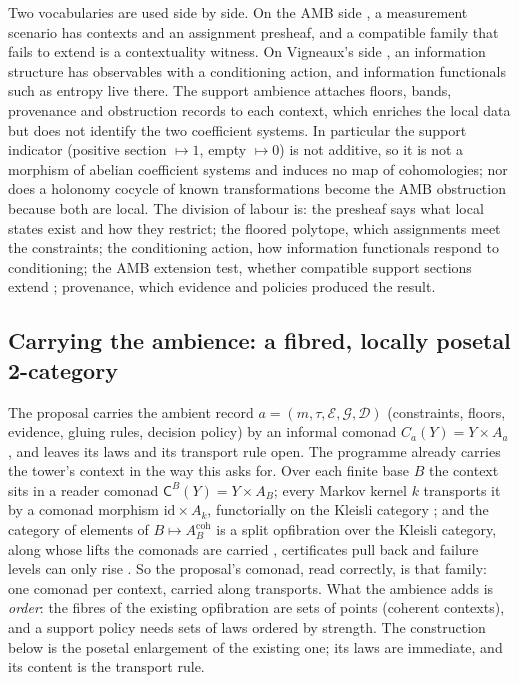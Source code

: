 \documentclass[11pt]{article}
\theoremstyle{definition}
\theoremstyle{remark}
\begin{document}
Two vocabularies are used side by side. On the AMB side \cite{AbramskyMansfieldBarbosa2012}, a measurement scenario has contexts and
an assignment presheaf, and a compatible family that fails to extend is a contextuality witness. On Vigneaux's side
\cite{Vigneaux2019,BaudotBennequin2015}, an information structure has observables with a conditioning action, and information
functionals such as entropy live there. The support ambience attaches floors, bands, provenance and obstruction records to each
context, which enriches the local data but does not identify the two coefficient systems. In particular the support indicator
(positive section $\mapsto1$, empty $\mapsto0$) is not additive, so it is not a morphism of abelian coefficient systems and induces
no map of cohomologies; nor does a holonomy cocycle of known transformations become the AMB obstruction because both are local. The
division of labour is: the presheaf says what local states exist and how they restrict; the floored polytope, which assignments
meet the constraints; the conditioning action, how information functionals respond to conditioning; the AMB extension test,
whether compatible support sections extend \cite{Vorobev1962}; provenance, which evidence and policies produced the result.

\subsection{Carrying the ambience: a fibred, locally posetal 2-category}\label{sec:fibred}
The proposal carries the ambient record $a=(m,\tau,\mathcal E,\mathcal G,\mathcal D)$ (constraints, floors, evidence, gluing rules,
decision policy) by an informal comonad $C_a(Y)=Y\times A_a$, and leaves its laws and its transport rule open. The programme already
carries the tower's context in the way this asks for. Over each finite base $B$ the context sits in a reader comonad
$\mathsf C^B(Y)=Y\times A_B$; every Markov kernel $k$ transports it by a comonad morphism $\mathrm{id}\times A_k$, functorially on
the Kleisli category \cite[Prop.~9.14]{Tower}; and the category of elements of $B\mapsto A_B^{\mathrm{coh}}$ is a split
opfibration over the Kleisli category, along whose lifts the comonads are carried \cite[Prop.~3.3]{Conditionals}, certificates pull
back and failure levels can only rise \cite[Thm.~3.1]{Conditionals}. So the proposal's comonad, read correctly, is that family:
one comonad per context, carried along transports. What the ambience adds is \emph{order}: the fibres of the existing opfibration are
sets of points (coherent contexts), and a support policy needs sets of laws ordered by strength. The construction below is the
posetal enlargement of the existing one; its laws are immediate, and its content is the transport rule.
\end{document}
